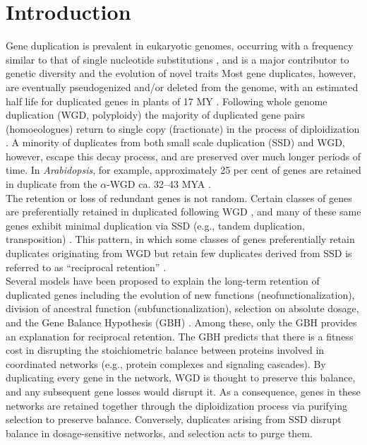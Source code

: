 \documentclass[11pt]{article}
\begin{document}


\resetlinenumber
\section*{Introduction}
Gene duplication is prevalent in eukaryotic genomes, occurring with a frequency similar to that of single nucleotide substitutions \citep{lynch2000, lynch2003a, tasdighian2017}, and is a major contributor to genetic diversity and the evolution of novel traits \citep{lynch2000} Most gene duplicates, however, are eventually pseudogenized and/or deleted from the genome, with an estimated half life for duplicated genes in plants of 17 MY \citep{lynch2003a}.
Following whole genome duplication (WGD, polyploidy) the majority of duplicated gene pairs (homoeologues) return to single copy (fractionate) in the process of diploidization \citep{langham2004, schnable2011}.
A minority of duplicates from both small scale duplication (SSD) and WGD, however, escape this decay process, and are preserved over much longer periods of time.
In \textit{Arabidopsis}, for example, approximately 25 per cent of genes are retained in duplicate from the $\alpha$-WGD ca. 32--43 MYA \citep{blanc2004, barker2009, edger2018}.\\

The retention or loss of redundant genes is not random.
Certain classes of genes are preferentially retained in duplicated following WGD \citep{blanc2004}, and many of these same genes exhibit minimal duplication via SSD (e.g., tandem duplication, transposition) \citep{freeling2009}.
This pattern, in which some classes of genes preferentially retain duplicates originating from WGD but retain few duplicates derived from SSD is referred to as ``reciprocal retention'' \citep{tasdighian2017}.\\

Several models have been proposed to explain the long-term retention of duplicated genes \citep{panchy2016} including the evolution of new functions (neofunctionalization), division of ancestral function (subfunctionalization), selection on absolute dosage, and the Gene Balance Hypothesis (GBH) \citep{freeling2009, birchler2012, papp2003}.
Among these, only the GBH provides an explanation for reciprocal retention.
The GBH predicts that there is a fitness cost in disrupting the stoichiometric balance between proteins involved in coordinated networks (e.g., protein complexes and signaling cascades).
By duplicating every gene in the network, WGD is thought to preserve this balance, and any subsequent gene losses would disrupt it.
As a consequence, genes in these networks are retained together through the diploidization process via purifying selection to preserve balance.
Conversely, duplicates arising from SSD disrupt balance in dosage-sensitive networks, and selection acts to purge them.\\
\end{document}
